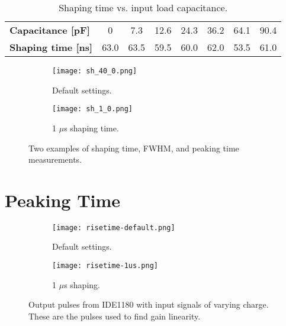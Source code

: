 \documentclass[../main/thesis.tex]{subfiles}
\begin{document}
\begin{table}[h!]
	\begin{center}
		\caption{Shaping time vs. input load capacitance.}
		\label{tab-ide-shaping-c}
		\begin{tabular}{lccccccc}\toprule
			\textbf{Capacitance [pF]}      & 0    & 7.3    & 12.6    & 24.3    & 36.2    & 64.1 & 90.4   \\ 
			\textbf{Shaping time [ns]} & 63.0 & 63.5 & 59.5 & 60.0 & 62.0 & 53.5 & 61.0   \\ \bottomrule
		\end{tabular}
	\end{center}
\end{table}

\begin{figure} [h!]%
	\centering
	\begin{subfigure}{.48\textwidth}
		\centering
		\texttt{[image: sh\_40\_0.png]}
		\caption{Default settings.}
		\label{fig-shape-40-0-}
	\end{subfigure}%
	\begin{subfigure}{.48\textwidth}
		\centering
		\texttt{[image: sh\_1\_0.png]}
		\caption{1 $\mu$s shaping time.}
		\label{fig-shape-1-0-} 
	\end{subfigure}
	\caption{Two examples of shaping time, \gls{FWHM}, and peaking time measurements.}
	\label{fig-shape-example}
\end{figure}

\section{Peaking Time}
\label{ide-risetime}

\begin{figure}
	\centering
	\begin{subfigure}{.48\textwidth}
		\centering
		\texttt{[image: risetime-default.png]}
		\caption{Default settings.}
		\label{fig-IDE1180-risetime-def}
	\end{subfigure}%
	\begin{subfigure}{.48\textwidth}
		\centering
		\texttt{[image: risetime-1us.png]}
		\caption{1 $\mu$s shaping.}
		\label{fig-IDE1180-risetime-1us} 
	\end{subfigure}
	\caption{Output pulses from IDE1180 with input signals of varying charge. These are the pulses used to find gain linearity.}
	\label{fig-IDE1180-risetime}
\end{figure}
\end{document}
